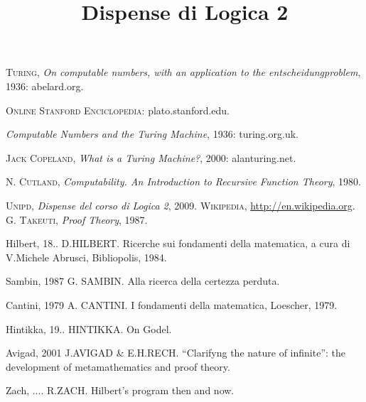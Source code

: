 \documentclass[10pt,a4paper]{amsbook}
\title{Dispense di Logica 2}
\author{}
\date{}
\begin{document}
\maketitle

\tableofcontents










\begin{thebibliography} {}
 \textsc{Turing}, \textsl{On computable numbers, with an
application to the entscheidungproblem}, 1936: abelard.org.

 \textsc{Online Stanford Enciclopedia}: plato.stanford.edu.

 \textsl{Computable Numbers and the Turing Machine}, 1936:
turing.org.uk.

 \textsc{Jack Copeland}, \textsl{What is a Turing Machine?}, 2000:
alanturing.net.

 \textsc{N. Cutland}, \textsl{Computability. An
  Introduction to Recursive Function Theory}, 1980.

 \textsc{Unipd}, \textsl{Dispense del corso di Logica 2},
  2009.
 \textsc{Wikipedia}, \url{http://en.wikipedia.org}.
 \textsc{G. Takeuti}, \textsl{Proof Theory}, 1987.

\bibitem{key-1}{[}Hilbert, 18.. D.HILBERT. Ricerche sui fondamenti
della matematica, a cura di V.Michele Abrusci, Bibliopolis, 1984.

\bibitem{key-4}{[}Sambin, 1987 G. SAMBIN. Alla ricerca della certezza
perduta. 

\bibitem{key-5}{[}Cantini, 1979 A. CANTINI. I fondamenti della matematica,
Loescher, 1979.

\bibitem{key-8}{[}Hintikka, 19.. HINTIKKA. On Godel.

\bibitem{key-1}{[}Avigad, 2001 J.AVIGAD \& E.H.RECH. {}``Clarifyng
the nature of infinite'': the development of metamathematics and
proof theory.

\bibitem{key-1}{[}Zach, .... R.ZACH. Hilbert's program then and now.

\end{thebibliography}
\end{document}

